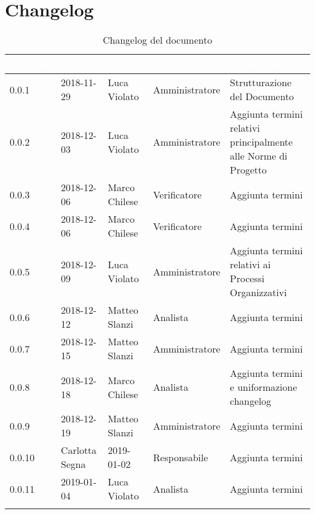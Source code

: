 \section{Changelog}

\begin{center}
\begin{longtable}[c]{|m{}|m{}|m{}|m{}|p{}|}
\hline
\rowcolor{bluelogo}\textbf{\textcolor{white}{Versione}} & \textbf{\textcolor{white}{Data}} & \textbf{\textcolor{white}{Autore}} & \textbf{\textcolor{white}{Ruolo}} & \textbf{\textcolor{white}{Descrizione}} \\
\hline \hline
\endfirsthead
0.0.1 & 2018-11-29 & Luca Violato & Amministratore & Strutturazione del Documento \\
\hline
\rowcolor{grigio}0.0.2 & 2018-12-03 & Luca Violato & Amministratore & Aggiunta termini relativi principalmente alle Norme di Progetto \\
\hline
0.0.3 & 2018-12-06 & Marco Chilese & Verificatore & Aggiunta termini\\
\hline 
\rowcolor{grigio}0.0.4 & 2018-12-06 & Marco Chilese & Verificatore & Aggiunta termini\\
\hline
0.0.5 & 2018-12-09 & Luca Violato & Amministratore & Aggiunta termini relativi ai Processi Organizzativi\\
\hline
\rowcolor{grigio}0.0.6 & 2018-12-12 & Matteo Slanzi & Analista & Aggiunta termini\\
\hline
0.0.7 & 2018-12-15 & Matteo Slanzi & Amministratore & Aggiunta termini\\
\hline
\rowcolor{grigio}0.0.8 & 2018-12-18 & Marco Chilese & Analista & Aggiunta termini e uniformazione changelog\\
\hline
0.0.9 & 2018-12-19 & Matteo Slanzi & Amministratore & Aggiunta termini\\
\hline
\rowcolor{grigio} 0.0.10 & Carlotta Segna & 2019-01-02 & Responsabile & Aggiunta termini\\
\hline
0.0.11 & 2019-01-04 & Luca Violato & Analista & Aggiunta termini\\
\hline
\caption{Changelog del documento}
\end{longtable}
\end{center}